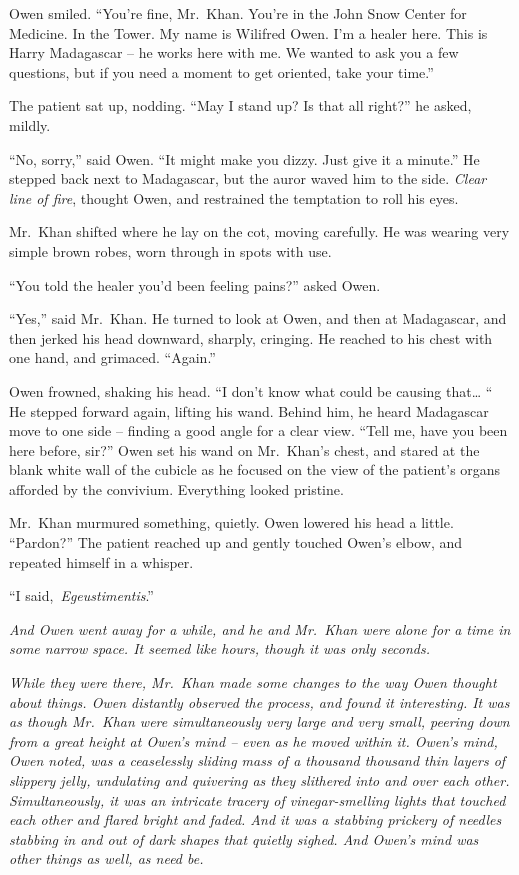 Owen smiled. ``You're fine, Mr.~Khan. You're in the John Snow Center for
Medicine. In the Tower. My name is Wilifred Owen. I'm a healer here.
This is Harry Madagascar -- he works here with me. We wanted to ask you
a few questions, but if you need a moment to get oriented, take your
time.''

The patient sat up, nodding. ``May I stand up? Is that all right?'' he
asked, mildly.

``No, sorry,'' said Owen. ``It might make you dizzy. Just give it a
minute.'' He stepped back next to Madagascar, but the auror waved him to
the side. \emph{Clear line of fire}, thought Owen, and restrained the
temptation to roll his eyes.

Mr.~Khan shifted where he lay on the cot, moving carefully. He was
wearing very simple brown robes, worn through in spots with use.

``You told the healer you'd been feeling pains?'' asked Owen.

``Yes,'' said Mr.~Khan. He turned to look at Owen, and then at
Madagascar, and then jerked his head downward, sharply, cringing. He
reached to his chest with one hand, and grimaced. ``Again.''

Owen frowned, shaking his head. ``I don't know what could be causing
that\ldots{} `` He stepped forward again, lifting his wand. Behind him,
he heard Madagascar move to one side -- finding a good angle for a clear
view. ``Tell me, have you been here before, sir?'' Owen set his wand on
Mr.~Khan's chest, and stared at the blank white wall of the cubicle as
he focused on the view of the patient's organs afforded by the
convivium. Everything looked pristine.

Mr.~Khan murmured something, quietly. Owen lowered his head a little.
``Pardon?'' The patient reached up and gently touched Owen's elbow, and
repeated himself in a whisper.

``I said,~\emph{Egeustimentis}.''

\emph{And Owen went away for a while, and he and Mr.~Khan were alone for
a time in some narrow space. It seemed like hours, though it was only
seconds.}

\emph{While they were there, Mr.~Khan made some changes to the way Owen
thought about things. Owen distantly observed the process, and found it
interesting. It was as though Mr.~Khan were simultaneously very large
and very small, peering down from a great height at Owen's mind -- even
as he moved within it. Owen's mind, Owen noted, was a ceaselessly
sliding mass of a thousand thousand thin layers of slippery jelly,
undulating and quivering as they slithered into and over each other.
Simultaneously, it was an intricate tracery of vinegar-smelling lights
that touched each other and flared bright and faded. And it was a
stabbing prickery of needles stabbing in and out of dark shapes that
quietly sighed. And Owen's mind was other things as well, as need be.}

